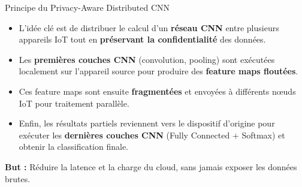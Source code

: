 \documentclass{beamer}
\begin{document}
\begin{frame}{Principe du Privacy-Aware Distributed CNN}
\begin{itemize}
    \item L’idée clé est de distribuer le calcul d’un \textbf{réseau CNN} entre plusieurs appareils IoT tout en \textbf{préservant la confidentialité} des données.
    \item Les \textbf{premières couches CNN} (convolution, pooling) sont exécutées localement sur l’appareil source pour produire des \textbf{feature maps floutées}.
    \item Ces feature maps sont ensuite \textbf{fragmentées} et envoyées à différents nœuds IoT pour traitement parallèle.
    \item Enfin, les résultats partiels reviennent vers le dispositif d’origine pour exécuter les \textbf{dernières couches CNN} (Fully Connected + Softmax) et obtenir la classification finale.
\end{itemize}

\vspace{0.3cm}
\textbf{But :} Réduire la latence et la charge du cloud, sans jamais exposer les données brutes.
\end{frame}
\end{document}
